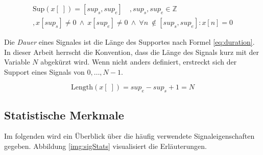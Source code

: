 \begin{equation}
\label{eq:support}
\begin{split}
\text{Sup}(x[\;]) = [sup_s, sup_e] \quad , sup_s, sup_e \in \mathbb{Z} \\,  x[sup_s] \neq 0 \:  \wedge \:  x[sup_e] \neq 0 \: \wedge \: \forall n \
\not\in [sup_s, sup_e] : x[n] = 0
\end{split}
\end{equation}

Die \emph{Dauer} eines Signales ist die Länge des Supportes nach Formel \ref{eq:duration}. In dieser Arbeit herrscht die Konvention, dass die Länge des Signals kurz mit der Variable $N$ abgekürzt wird. Wenn nicht anders definiert, erstreckt sich der Support eines Signals von $0 ,\ldots, N-1$.\cite[S. 24]{dspMichigan}

\begin{equation}
\text{Length}(x[\;]) = sup_e - sup_s + 1 = N
\label{eq:duration}
\end{equation}


\subsection{Statistische Merkmale}

Im folgenden wird ein Überblick über die häufig verwendete Signaleigenschaften gegeben. Abbildung \ref{img:sigStats} visualisiert die Erläuterungen.

